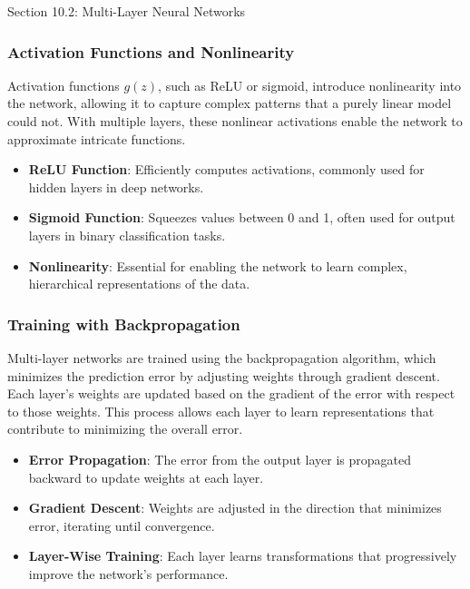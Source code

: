 \begin{notes}{Section 10.2: Multi-Layer Neural Networks}
    \subsubsection*{Activation Functions and Nonlinearity}
    
    Activation functions $g(z)$, such as ReLU or sigmoid, introduce nonlinearity into the network, allowing it to capture complex patterns that a purely linear model could not. With multiple layers, 
    these nonlinear activations enable the network to approximate intricate functions.
    
    \begin{highlight}
        \begin{itemize}
            \item \textbf{ReLU Function}: Efficiently computes activations, commonly used for hidden layers in deep networks.
            \item \textbf{Sigmoid Function}: Squeezes values between 0 and 1, often used for output layers in binary classification tasks.
            \item \textbf{Nonlinearity}: Essential for enabling the network to learn complex, hierarchical representations of the data.
        \end{itemize}
    \end{highlight}
    
    \subsubsection*{Training with Backpropagation}
    
    Multi-layer networks are trained using the backpropagation algorithm, which minimizes the prediction error by adjusting weights through gradient descent. Each layer's weights are updated based on the 
    gradient of the error with respect to those weights. This process allows each layer to learn representations that contribute to minimizing the overall error.
    
    \begin{highlight}
        \begin{itemize}
            \item \textbf{Error Propagation}: The error from the output layer is propagated backward to update weights at each layer.
            \item \textbf{Gradient Descent}: Weights are adjusted in the direction that minimizes error, iterating until convergence.
            \item \textbf{Layer-Wise Training}: Each layer learns transformations that progressively improve the network's performance.
        \end{itemize}
    \end{highlight}
    

\end{notes}
